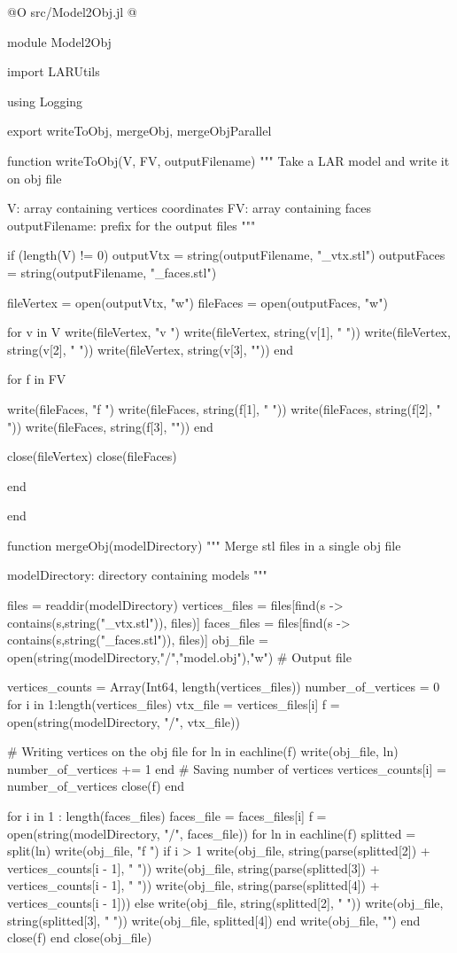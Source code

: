 \documentclass[11pt,oneside]{article}	%
\begin{document}
@O src/Model2Obj.jl
@{module Model2Obj

import LARUtils

using Logging

export writeToObj, mergeObj, mergeObjParallel

function writeToObj(V, FV, outputFilename)
  """
  Take a LAR model and write it on obj file

  V: array containing vertices coordinates
  FV: array containing faces
  outputFilename: prefix for the output files
  """

  if (length(V) != 0)
    outputVtx = string(outputFilename, "_vtx.stl")
    outputFaces = string(outputFilename, "_faces.stl")

    fileVertex = open(outputVtx, "w")
    fileFaces = open(outputFaces, "w")

    for v in V
      write(fileVertex, "v ")
      write(fileVertex, string(v[1], " "))
      write(fileVertex, string(v[2], " "))
      write(fileVertex, string(v[3], "\n"))
    end

    for f in FV

      write(fileFaces, "f ")
      write(fileFaces, string(f[1], " "))
      write(fileFaces, string(f[2], " "))
      write(fileFaces, string(f[3], "\n"))
    end

    close(fileVertex)
    close(fileFaces)

  end

end

function mergeObj(modelDirectory)
  """
  Merge stl files in a single obj file

  modelDirectory: directory containing models
  """

  files = readdir(modelDirectory)
  vertices_files = files[find(s -> contains(s,string("_vtx.stl")), files)]
  faces_files = files[find(s -> contains(s,string("_faces.stl")), files)]
  obj_file = open(string(modelDirectory,"/","model.obj"),"w") # Output file

  vertices_counts = Array(Int64, length(vertices_files))
  number_of_vertices = 0
  for i in 1:length(vertices_files)
    vtx_file = vertices_files[i]
    f = open(string(modelDirectory, "/", vtx_file))

    # Writing vertices on the obj file
    for ln in eachline(f)
      write(obj_file, ln)
      number_of_vertices += 1
    end
    # Saving number of vertices
    vertices_counts[i] = number_of_vertices
    close(f)
  end

  for i in 1 : length(faces_files)
    faces_file = faces_files[i]
    f = open(string(modelDirectory, "/", faces_file))
    for ln in eachline(f)
      splitted = split(ln)
      write(obj_file, "f ")
      if i > 1
        write(obj_file, string(parse(splitted[2]) + vertices_counts[i - 1], " "))
        write(obj_file, string(parse(splitted[3]) + vertices_counts[i - 1], " "))
        write(obj_file, string(parse(splitted[4]) + vertices_counts[i - 1]))
      else
        write(obj_file, string(splitted[2], " "))
        write(obj_file, string(splitted[3], " "))
        write(obj_file, splitted[4])
      end
      write(obj_file, "\n")
    end
    close(f)
  end
  close(obj_file)

}
\end{document}
